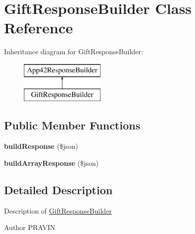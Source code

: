 \hypertarget{class_gift_response_builder}{\section{Gift\+Response\+Builder Class Reference}
\label{class_gift_response_builder}
}
Inheritance diagram for Gift\+Response\+Builder\+:\begin{figure}[H]
\begin{center}
\leavevmode
\includegraphics[height=2.000000cm]{class_gift_response_builder}
\end{center}
\end{figure}
\subsection*{Public Member Functions}
\begin{DoxyCompactItemize}
\item 
\hypertarget{class_gift_response_builder_a8bc94acdaada04a52b74b8f9afb25c4c}{{\bfseries build\+Response} (\$json)}\label{class_gift_response_builder_a8bc94acdaada04a52b74b8f9afb25c4c}

\item 
\hypertarget{class_gift_response_builder_a901d0fc914904a6314c201378ce5f763}{{\bfseries build\+Array\+Response} (\$json)}\label{class_gift_response_builder_a901d0fc914904a6314c201378ce5f763}

\end{DoxyCompactItemize}


\subsection{Detailed Description}
Description of \hyperlink{class_gift_response_builder}{Gift\+Response\+Builder}

\begin{DoxyAuthor}{Author}
P\+R\+A\+V\+I\+N 
\end{DoxyAuthor}

